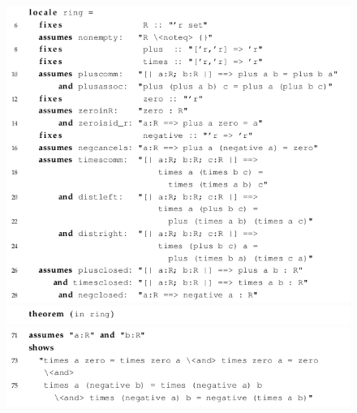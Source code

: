 \begin{figure}[H]
\begin{center}
\includegraphics[scale=0.6]{Figures/Background/ringfull1.png}
\includegraphics[scale=0.6]{Figures/Background/ringfull2.png}
\includegraphics[scale=0.6]{Figures/Background/ringfull3.png}
\end{center}
\end{figure}

